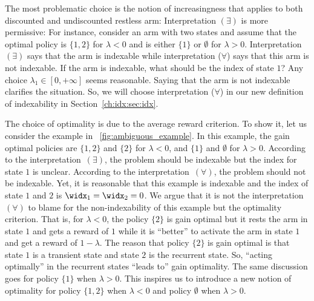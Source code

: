 The most problematic choice is the notion of increasingness that applies to both discounted and undiscounted restless arm: Interpretation $(\exists)$ is more permissive: For instance, consider an arm with two states and assume that the optimal policy is $\{1,2\}$ for $\lambda<0$ and is either $\{1\}$ or $\emptyset$ for $\lambda>0$.
Interpretation $(\exists)$ says that the arm is indexable while interpretation ($\forall$) says that this arm is not indexable.
If the arm is indexable, what should be the index of state $1$?
Any choice $\lambda_1\in[0,+\infty]$ seems reasonable.
Saying that the arm is not indexable clarifies the situation.
So, we will choose interpretation ($\forall$) in our new definition of indexability in Section~\ref{ch:idx:sec:idx}.

The choice of optimality is due to the average reward criterion.
To show it, let us consider the example in \figurename~\ref{fig:ambiguous_example}.
In this example, the gain optimal policies are $\{1,2\}$ and $\{2\}$ for $\lambda<0$, and $\{1\}$ and $\emptyset$ for $\lambda>0$.
According to the interpretation~$(\exists)$, the problem should be indexable but the index for state $1$ is unclear.
According to the interpretation~$(\forall)$, the problem should not be indexable.
Yet, it is reasonable that this example is indexable and the index of state $1$ and $2$ is $\widx_1=\widx_2=0$.
We argue that it is not the interpretation~$(\forall)$ to blame for the non-indexability of this example but the optimality criterion.
That is, for $\lambda<0$, the policy $\{2\}$ is gain optimal but it rests the arm in state $1$ and gets a reward of $1$ while it is ``better'' to activate the arm in state $1$ and get a reward of $1-\lambda$. 
The reason that policy $\{2\}$ is gain optimal is that state $1$ is a transient state and state $2$ is the recurrent state.
So, ``acting optimally'' in the recurrent states ``leads to'' gain optimality.
The same discussion goes for policy $\{1\}$ when $\lambda>0$.
This inspires us to introduce a new notion of optimality for policy $\{1,2\}$ when $\lambda<0$ and policy $\emptyset$ when $\lambda>0$.

